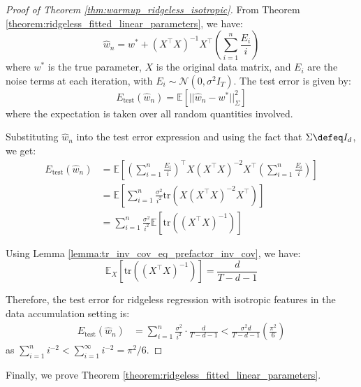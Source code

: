 \begin{proof}[Proof of Theorem \ref{thm:warmup_ridgeless_isotropic}]
From Theorem \ref{theorem:ridgeless_fitted_linear_parameters}, we have:
\begin{equation}
\hat{w}_n = w^* + (X^\top X)^{-1} X^\top \left(\sum_{i=1}^n \frac{E_i}{i}\right)
\end{equation}
where $w^*$ is the true parameter, $X$ is the original data matrix, and $E_i$ are the noise terms at each iteration, with $E_i \sim \mathcal{N}(0, \sigma^2 I_T)$. The test error is given by:
\begin{equation}
E_{\text{test}}(\hat{w}_n) = \mathbb{E}[||\hat{w}_n - w^*||_{\Sigma}^2]
\end{equation}where the expectation is taken over all random quantities involved.

Substituting $\hat{w}_n$ into the test error expression and using the fact that $\Sigma \defeq I_d$, we get:
\begin{align*}
E_{\text{test}}(\hat{w}_n) &= \mathbb{E}\left[\left(\sum_{i=1}^n \frac{E_i}{i}\right)^\top X(X^\top X)^{-2} X^\top \left(\sum_{i=1}^n \frac{E_i}{i}\right)\right] \\
&= \mathbb{E}\left[\sum_{i=1}^n \frac{\sigma^2}{i^2} \text{tr}(X(X^\top X)^{-2} X^\top)\right] \\
&= \sum_{i=1}^n \frac{\sigma^2}{i^2} \mathbb{E}\left[\text{tr}((X^\top X)^{-1})\right]
\end{align*}

Using Lemma \ref{lemma:tr_inv_cov_eq_prefactor_inv_cov}, we have:
\begin{equation}
\mathbb{E}_{X}\left[\text{tr}((X^\top X)^{-1})\right] = \frac{d}{T-d-1}
\end{equation}

Therefore, the test error for ridgeless regression with isotropic features in the data accumulation setting is:
\begin{align*}
E_{\text{test}}(\hat{w}_n) &= \sum_{i=1}^n \frac{\sigma^2}{i^2} \cdot \frac{d}{T-d-1} < \frac{\sigma^2 d}{T-d-1} \left(\frac{\pi^2}{6}\right)
\end{align*}
as $\sum_{i=1}^n i^{-2} < \sum_{i=1}^\infty i^{-2} = \pi^2/6$.
\end{proof}

Finally, we prove Theorem \ref{theorem:ridgeless_fitted_linear_parameters}.

